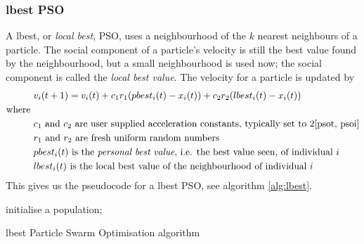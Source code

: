 \subsubsection{lbest PSO}
A lbest, or \emph{local best}, PSO, uses a neighbourhood of the $k$ nearest neighbours of a particle. The social component of a particle's velocity is still the best value found by the neighbourhood, but a small neighbourhood is used now; the social component is called the \emph{local best value}. The velocity for a particle is updated by\cite{4-pso}
 \begin{equation}
  \begin{split}
    &v_{i}(t+1) = v_{i}(t) + c_{1}r_{1}(pbest_{i}(t) - x_{i}(t)) + c_{2}r_{2}(lbest_{i}(t) - x_{i}(t)) \\
    \text{where } \\
    &c_{1}\text{ and }c_{2} \text{ are user supplied acceleration constants, typically set to 2\cite{psot, psoi}} \\
    &r_{1}\text{ and }r_{2}\text{ are fresh uniform random numbers} \\
    &pbest_{i}(t)\text{ is the \emph{personal best value}, i.e. the best value seen, of individual }i \\
    &lbest_{i}(t)\text{ is the local best value of the neighbourhood of individual }i
  \end{split}
\label{eq:lvel}
\end{equation}
This gives us the pseudocode for a lbest PSO, see algorithm \ref{alg:lbest}.
\begin{algorithm}[tp]
\label{alg:lbest}
  \SetAlgoLined
  initialise a population; \\
\caption{lbest Particle Swarm Optimisation algorithm}
\end{algorithm}

